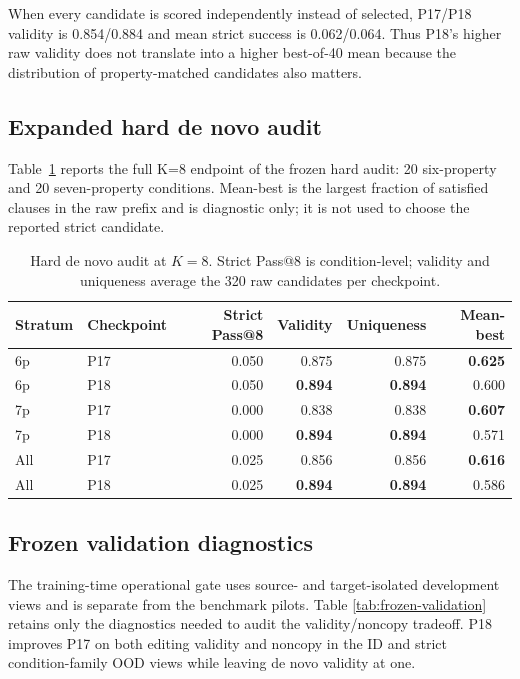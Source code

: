 When every candidate is scored independently instead of selected, P17/P18
validity is 0.854/0.884 and mean strict success is 0.062/0.064. Thus P18's
higher raw validity does not translate into a higher best-of-40 mean because
the distribution of property-matched candidates also matters.

\subsection{Expanded hard de novo audit}
\label{sec:appendix-hard}

Table~\ref{tab:hard-denovo} reports the full K=8 endpoint of the frozen hard
audit: 20 six-property and 20 seven-property conditions. Mean-best is the
largest fraction of satisfied clauses in the raw prefix and is diagnostic
only; it is not used to choose the reported strict candidate.

\begin{table}[h]
  \centering
  \caption{Hard de novo audit at $K=8$. Strict Pass@8 is condition-level;
  validity and uniqueness average the 320 raw candidates per checkpoint.}
  \label{tab:hard-denovo}
  \small
  \setlength{\tabcolsep}{4pt}
  \begin{tabular}{llrrrr}
    \toprule
    Stratum & Checkpoint & Strict Pass@8 & Validity & Uniqueness & Mean-best \\
    \midrule
    6p & P17 & 0.050 & 0.875 & 0.875 & \textbf{0.625} \\
    6p & P18 & 0.050 & \textbf{0.894} & \textbf{0.894} & 0.600 \\
    \midrule
    7p & P17 & 0.000 & 0.838 & 0.838 & \textbf{0.607} \\
    7p & P18 & 0.000 & \textbf{0.894} & \textbf{0.894} & 0.571 \\
    \midrule
    All & P17 & 0.025 & 0.856 & 0.856 & \textbf{0.616} \\
    All & P18 & 0.025 & \textbf{0.894} & \textbf{0.894} & 0.586 \\
    \bottomrule
  \end{tabular}
\end{table}

\subsection{Frozen validation diagnostics}
\label{sec:appendix-validation}

The training-time operational gate uses source- and target-isolated
development views and is separate from the benchmark pilots. Table
\ref{tab:frozen-validation} retains only the diagnostics needed to audit the
validity/noncopy tradeoff. P18 improves P17 on both editing validity and
noncopy in the ID and strict condition-family OOD views while leaving de novo
validity at one.

